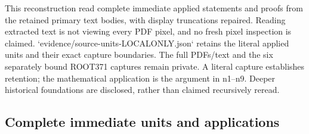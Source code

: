 \documentclass[11pt]{article}
\begin{document}
This reconstruction read complete immediate applied statements and proofs from the retained primary text bodies, with display truncations repaired. Reading extracted text is not viewing every PDF pixel, and no fresh pixel inspection is claimed. `evidence/source-units-LOCALONLY.json` retains the literal applied units and their exact capture boundaries. The full PDFs/text and the six separately bound ROOT371 captures remain private. A literal capture establishes retention; the mathematical application is the argument in n1--n9. Deeper historical foundations are disclosed, rather than claimed recursively reread.

\subsection{Complete immediate units and applications}
\end{document}
